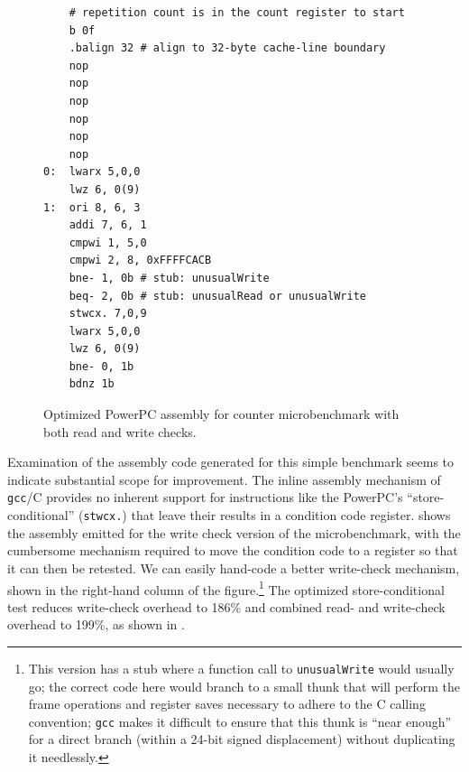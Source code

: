 \begin{figure}
\sis\fontsize{9}{10}\begin{verbatim}
    # repetition count is in the count register to start
    b 0f
    .balign 32 # align to 32-byte cache-line boundary
    nop
    nop
    nop
    nop
    nop
    nop
0:  lwarx 5,0,0
    lwz 6, 0(9)
1:  ori 8, 6, 3
    addi 7, 6, 1
    cmpwi 1, 5,0
    cmpwi 2, 8, 0xFFFFCACB
    bne- 1, 0b # stub: unusualWrite
    beq- 2, 0b # stub: unusualRead or unusualWrite
    stwcx. 7,0,9
    lwarx 5,0,0
    lwz 6, 0(9)
    bne- 0, 1b
    bdnz 1b
\end{verbatim}
\caption{Optimized PowerPC assembly for counter microbenchmark with both read
  and write checks.}
\label{fig:rw-assem}
\end{figure}
Examination of the assembly code generated for this simple benchmark
seems to indicate substantial scope for improvement.  The inline
assembly mechanism of \texttt{gcc}/C provides no inherent support for
instructions 
like the PowerPC's ``store-conditional'' (\texttt{stwcx.}) that leave
their results in a condition code register.  
shows the assembly emitted for the write check version of the
microbenchmark, with the cumbersome mechanism required to move the
condition code to a register so that it can then be retested.  We can
easily hand-code a better write-check mechanism, shown in the
right-hand column of the figure.\footnote{This version has a stub where a
function call to \texttt{unusualWrite} would usually go; the correct
code here would branch to a small thunk that will perform the
frame operations and register saves necessary to adhere to the C
calling convention; \texttt{gcc} makes it difficult to ensure that
this thunk is ``near enough'' for a direct branch (within a 24-bit
signed displacement) without duplicating it needlessly.}
The optimized store-conditional test reduces write-check overhead to
186\% and combined read- and write-check overhead to 199\%, as shown
in .

